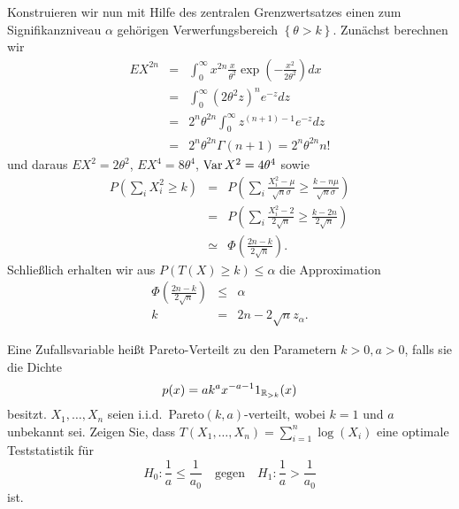 Konstruieren wir nun mit Hilfe des zentralen Grenzwertsatzes einen zum Signifikanzniveau 
$\alpha$ gehörigen Verwerfungsbereich $\left\{ \theta>k \right\}$. Zunächst berechnen wir
\begin{eqnarray*}
    E X^{2n} &=&  \int_{0}^{\infty} x^{2n} \frac{x}{\theta^2} \exp \left( - \frac{x^2}{2\theta^2} \right) dx \\
    &=&  \int_{0}^{\infty} \left( 2 \theta^2 z \right)^n e^{-z} dz \\
    &=& 2^n \theta^{2n} \int_{0}^{\infty} z^{(n+1)-1}e^{-z} dz  \\
    &=& 2^n \theta^{2n} \Gamma(n+1) = 2^n \theta^{2n} n!
\end{eqnarray*}
und daraus $E X^2 = 2 \theta^2$, $E X^4 = 8 \theta^4$, $\operatorname{Var} X^2 = 4 \theta^4$ sowie
\begin{eqnarray*}
    P \left( \sum_{i} X_i^2 \geq k \right)&=&  
    P \left( \sum_{i}^{} \frac{X_i^2 - \mu}{\sqrt{n} \sigma} \geq \frac{k -n \mu}{\sqrt{n} \sigma} \right) \\
    &=& P \left( \sum_{i}^{} \frac{X_i^2 - 2}{2\sqrt{n}} \geq \frac{k-2n}{2\sqrt{n}} \right) \\
    &\simeq & \Phi \left( \frac{2n -k}{2 \sqrt{n}} \right). 
\end{eqnarray*}
Schließlich erhalten wir aus $P \left( T(X) \geq k \right) \leq \alpha$ die Approximation
\begin{eqnarray*}
    \Phi\left( \frac{2n - k}{ 2\sqrt{n}}  \right) &\leq & \alpha \\
    k &=& 2n - 2 \sqrt{n} z_\alpha.
\end{eqnarray*}





  Eine Zufallsvariable heißt Pareto-Verteilt
zu den Parametern $k>0,a>0$, falls sie die Dichte 
\begin{equation*}
    p(x) = a k^a x^{-a-1} 1_{\mathbb R_{>k}}(x)
\end{equation*}
besitzt. $X_1,\ldots,X_n$ seien i.i.d.\ Pareto$(k,a)$-verteilt, wobei $k=1$ und $a$ unbekannt sei.
Zeigen Sie, dass $T(X_1,\ldots,X_n)= \sum_{i=1}^{n} \log\left( X_i \right)$ eine optimale 
Teststatistik für
\begin{equation*}
    H_0 : \frac{1}{a} \leq \frac{1}{a_0} \quad \textrm{gegen} \quad H_1 : \frac{1}{a} > \frac{1}{a_0}
\end{equation*}
ist.

